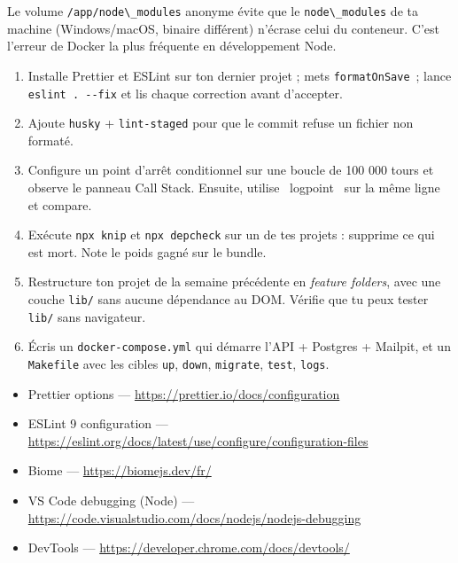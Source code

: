\documentclass[12pt,a4paper,twoside,openright]{book}
\begin{document}
\begin{note}
Le volume \verb|/app/node\_modules| anonyme \'evite que le \verb|node\_modules| de ta machine
(Windows/macOS, binaire diff\'erent) n'\'ecrase celui du conteneur. C'est l'erreur de Docker la
plus fr\'equente en d\'eveloppement Node.
\end{note}

\begin{exercice}
\begin{enumerate}
  \item Installe Prettier et ESLint sur ton dernier projet ; mets \verb|formatOnSave|~; lance
        \verb|eslint . --fix| et lis chaque correction avant d'accepter.
  \item Ajoute \verb|husky| + \verb|lint-staged| pour que le commit refuse un fichier non format\'e.
  \item Configure un point d'arr\^et conditionnel sur une boucle de 100 000 tours et observe le
        panneau Call Stack. Ensuite, utilise \og ~logpoint~ \fg{} sur la m\^eme ligne et compare.
  \item Ex\'ecute \verb|npx knip| et \verb|npx depcheck| sur un de tes projets : supprime ce qui
        est mort. Note le poids gagn\'e sur le bundle.
  \item Restructure ton projet de la semaine pr\'ec\'edente en \emph{feature folders}, avec une
        couche \verb|lib/| sans aucune d\'ependance au DOM. V\'erifie que tu peux tester \verb|lib/|
        sans navigateur.
  \item \'Ecris un \verb|docker-compose.yml| qui d\'emarre l'API + Postgres + Mailpit, et un
        \verb|Makefile| avec les cibles \verb|up|, \verb|down|, \verb|migrate|, \verb|test|, \verb|logs|.
\end{enumerate}
\end{exercice}

\begin{ressources}
\begin{itemize}
  \item Prettier options --- \url{https://prettier.io/docs/configuration}
  \item ESLint 9 configuration --- \url{https://eslint.org/docs/latest/use/configure/configuration-files}
  \item Biome --- \url{https://biomejs.dev/fr/}
  \item VS Code debugging (Node) --- \url{https://code.visualstudio.com/docs/nodejs/nodejs-debugging}
  \item DevTools --- \url{https://developer.chrome.com/docs/devtools/}
\end{itemize}
\end{ressources}
\end{document}
